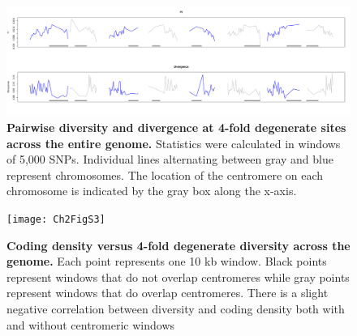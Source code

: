 \begin{figure}[ht!]
      \centering
       \includegraphics[width=\linewidth]{Ch2FigS2.pdf}
    \caption{\textbf{Pairwise diversity and divergence at 4-fold degenerate sites across the entire genome.} Statistics were calculated in windows of 5,000 SNPs. Individual lines alternating between gray and blue represent chromosomes. The location of the centromere on each chromosome is indicated by the gray box along the x-axis.}
    \label{fig:figS2}
\end{figure}

\begin{figure}[ht!]
      \centering
       \texttt{[image: Ch2FigS3]}
    \caption{\textbf{Coding density versus 4-fold degenerate diversity across the genome.} Each point represents one 10 kb window. Black points represent windows that do not overlap centromeres while gray points represent windows that do overlap centromeres. There is a slight negative correlation between diversity and coding density both with and without centromeric windows}
    \label{fig:figS3}
\end{figure}

